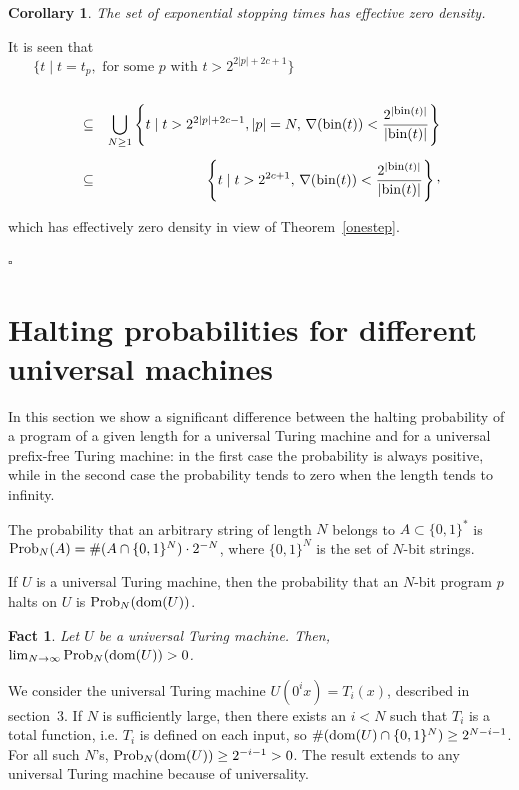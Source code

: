 \documentclass[12pt,twoside,openright]{report}
\newcommand{\QED}{\hfill $\square$}
\newcommand{\dom}{\mbox{\rm dom}}
\newcommand{\bin}{\mbox{bin}}
\newcommand{\fbin}{\mbox{\rm \footnotesize{bin}}}
\newcommand{\Prob}{{\rm Prob}}
\newtheorem{fact}[thm]{Fact}
\newtheorem{cor}[thm]{Corollary}
\newcommand{\myproof}{\noindent {\em Proof.}  }
\begin{document}
\begin{cor}
The set of exponential stopping times has effective zero density.
\end{cor}

\myproof It is seen that 
\[ \{t \mid t=t_{p}, \mbox{  for some } p \mbox{  with  } t > 2^{2|p|+2c+1}\}  \phantom{xxxxxxxxxxxxxxxxxxxxxxxx}\]\\[-7ex]
\begin{eqnarray*}
&\subseteq & \bigcup_{N\ge 1}\left\{ t \mid  t >  2^{2|p|+2c-1}, |p|=N, \, \nabla (\bin(t)) < \frac{2^{|\fbin (t)|}}{|\bin(t)|}\right\}\\[1ex]
&\subseteq & \left\{ t \mid  t >  2^{2c+1},  \, \nabla (\bin(t)) < \frac{2^{|\fbin (t)|}}{|\bin(t)|}\right\}\raisebox{0.5ex},
\end{eqnarray*}

\noindent which has effectively zero density in view of Theorem~\ref{onestep}.

\QED
   
\section{Halting probabilities for different universal machines}

In this section we show a significant difference between the halting probability of a program of a given length for a universal Turing machine and for a universal prefix-free  Turing machine: in the first case the probability is always positive, while in the second case the probability tends to zero when the length tends to infinity.

\medskip

The probability that an arbitrary string of length $N$ belongs to $A \subset \{0, 1\}^{*}$ is $\Prob_{N}(A) = \#(A\cap \{0, 1\}^{N})\cdot 2^{-N}$, where $ \{0, 1\}^{N}$ is the set of $N$-bit strings. 

If $U$ is a universal Turing machine, then the probability that an $N$-bit program $p$ halts on $U$ is  $\Prob_{N}(\dom (U))$. 

\medskip

\begin{fact} 
Let $U$ be a universal Turing machine. Then, $\lim_{N \rightarrow \infty} \Prob_{N}(\dom (U)) >0$. 
\end{fact}
\myproof We consider the universal Turing machine $U(0^{i}x) = T_{i}(x)$, described in section~3.   If $N$ is sufficiently large, then there exists an $i <N$ such that $T_{i}$ is a total function, i.e. $T_{i}$  is defined on each input, so  $\#(\dom (U) \cap \{0, 1\}^{N}) \ge 2^{N-i-1}$. For all  such  $N$'s, $\Prob_{N}(\dom (U)) \ge 2^{-i-1}>0$.  The result extends to any universal Turing machine because of universality.
\end{document}
